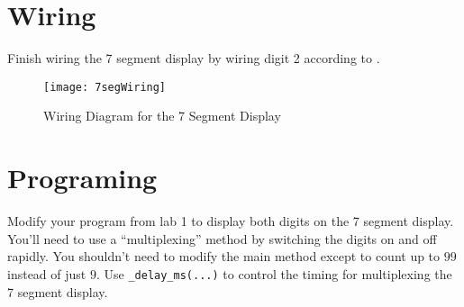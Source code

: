 \documentclass[main.tex]{subfile}
\begin{document}
\section{Wiring} 
\label{sec:wiring}

Finish wiring the 7 segment display by wiring digit 2 according to
.

\begin{figure}[H]
	\begin{center}
		\texttt{[image: 7segWiring]}
	\end{center}
	\caption{Wiring Diagram for the 7 Segment Display}
	\label{fig:wiringDia}
\end{figure}


\section{Programing} 
\label{sec:programing}

Modify your program from lab 1 to display both digits on the 7 segment display.
You'll need to use a ``multiplexing'' method by switching the digits on and off
rapidly. You shouldn't need to modify the main method except to count up to $99$
instead of just $9$. Use \texttt{_delay_ms(...)} to control the timing for
multiplexing the 7 segment display.

\end{document}
